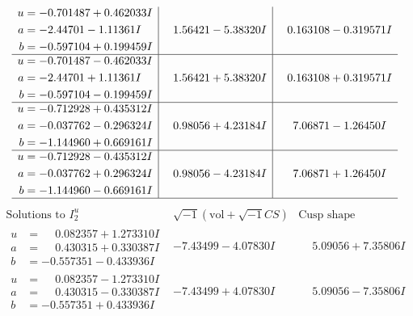 \documentclass[1p]{elsarticle_modified}
\theoremstyle{definition}
\newcommand{\I}{\sqrt{-1}}
\begin{document}
$$\begin{array}{c|c|c}
\begin{aligned}
u &= -0.701487 + 0.462033 I \\
a &= -2.44701 - 1.11361 I \\
b &= -0.597104 + 0.199459 I\end{aligned}
 & \phantom{-}1.56421 - 5.38320 I & \phantom{-}0.163108 - 0.319571 I \\ \hline\begin{aligned}
u &= -0.701487 - 0.462033 I \\
a &= -2.44701 + 1.11361 I \\
b &= -0.597104 - 0.199459 I\end{aligned}
 & \phantom{-}1.56421 + 5.38320 I & \phantom{-}0.163108 + 0.319571 I \\ \hline\begin{aligned}
u &= -0.712928 + 0.435312 I \\
a &= -0.037762 - 0.296324 I \\
b &= -1.144960 + 0.669161 I\end{aligned}
 & \phantom{-}0.98056 + 4.23184 I & \phantom{-}7.06871 - 1.26450 I \\ \hline\begin{aligned}
u &= -0.712928 - 0.435312 I \\
a &= -0.037762 + 0.296324 I \\
b &= -1.144960 - 0.669161 I\end{aligned}
 & \phantom{-}0.98056 - 4.23184 I & \phantom{-}7.06871 + 1.26450 I\\
 \hline 
 \end{array}$$\newpage$$\begin{array}{c|c|c}  
\text{Solutions to }I^u_{2}& \I (\text{vol} + \sqrt{-1}CS) & \text{Cusp shape}\\
 \hline 
\begin{aligned}
u &= \phantom{-}0.082357 + 1.273310 I \\
a &= \phantom{-}0.430315 + 0.330387 I \\
b &= -0.557351 - 0.433936 I\end{aligned}
 & -7.43499 - 4.07830 I & \phantom{-}5.09056 + 7.35806 I \\ \hline\begin{aligned}
u &= \phantom{-}0.082357 - 1.273310 I \\
a &= \phantom{-}0.430315 - 0.330387 I \\
b &= -0.557351 + 0.433936 I\end{aligned}
 & -7.43499 + 4.07830 I & \phantom{-}5.09056 - 7.35806 I \\ \hline\begin{aligned}

\end{aligned}
\end{array}$$
\end{document}
